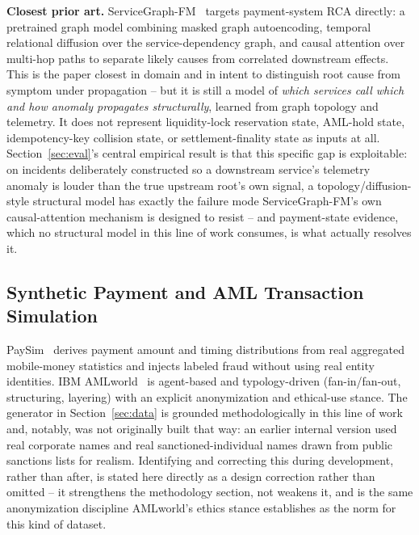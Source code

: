 \documentclass[conference]{IEEEtran}
\begin{document}
\textbf{Closest prior art.} ServiceGraph-FM~\cite{servicegraphfm2026}
targets payment-system RCA directly: a pretrained graph model combining
masked graph autoencoding, temporal relational diffusion over the
service-dependency graph, and causal attention over multi-hop paths to
separate likely causes from correlated downstream effects. This is the
paper closest in domain and in intent to distinguish root cause from
symptom under propagation -- but it is still a model of \emph{which
services call which and how anomaly propagates structurally}, learned from
graph topology and telemetry. It does not represent liquidity-lock
reservation state, AML-hold state, idempotency-key collision state, or
settlement-finality state as inputs at all. Section~\ref{sec:eval}'s
central empirical result is that this specific gap is exploitable: on
incidents deliberately constructed so a downstream service's telemetry
anomaly is louder than the true upstream root's own signal, a
topology/diffusion-style structural model has exactly the failure mode
ServiceGraph-FM's own causal-attention mechanism is designed to resist --
and payment-state evidence, which no structural model in this line of work
consumes, is what actually resolves it.

\subsection{Synthetic Payment and AML Transaction Simulation}
PaySim~\cite{paysim2016} derives payment amount and timing distributions
from real aggregated mobile-money statistics and injects labeled fraud
without using real entity identities. IBM AMLworld~\cite{amlworld2023} is
agent-based and typology-driven (fan-in/fan-out, structuring, layering)
with an explicit anonymization and ethical-use stance. The generator in
Section~\ref{sec:data} is grounded methodologically in this line of work
and, notably, was not originally built that way: an earlier internal
version used real corporate names and real sanctioned-individual names
drawn from public sanctions lists for realism. Identifying and correcting
this during development, rather than after, is stated here directly as a
design correction rather than omitted -- it strengthens the methodology
section, not weakens it, and is the same anonymization discipline
AMLworld's ethics stance establishes as the norm for this kind of dataset.
\end{document}
